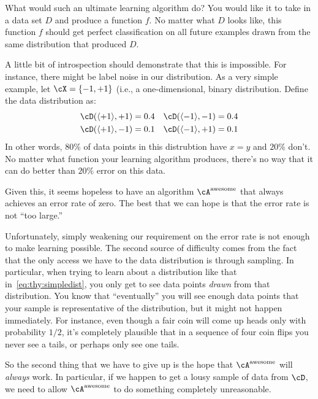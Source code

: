 What would such an ultimate learning algorithm do?  You would like it
to take in a data set $D$ and produce a function $f$.  No matter what
$D$ looks like, this function $f$ should get perfect classification on
all future examples drawn from the same distribution that produced
$D$.

A little bit of introspection should demonstrate that this is
impossible.  For instance, there might be label noise in our
distribution.  As a very simple example, let $\cX = \{-1,+1\}$ (i.e.,
a one-dimensional, binary distribution.  Define the data distribution
as:
\begin{align}  \label{eq:thy:simpledist}
\cD( \langle +1 \rangle , +1 ) &= 0.4 &
\cD( \langle -1 \rangle , -1 ) &= 0.4 \\
\cD( \langle +1 \rangle , -1 ) &= 0.1 &
\cD( \langle -1 \rangle , +1 ) &= 0.1
\end{align}
In other words, $80\%$ of data points in this distrubtion have $x = y$
and $20\%$ don't.  No matter what function your learning algorithm
produces, there's no way that it can do better than $20\%$ error on
this data.


Given this, it seems hopeless to have an algorithm
$\cA^{\text{awesome}}$ that always achieves an error rate of zero.
The best that we can hope is that the error rate is not ``too large.''

Unfortunately, simply weakening our requirement on the error rate is
not enough to make learning possible.  The second source of difficulty
comes from the fact that the only access we have to the data
distribution is through sampling.  In particular, when trying to learn
about a distribution like that in~\ref{eq:thy:simpledist}, you only get
to see data points \emph{drawn} from that distribution.  You know that
``eventually'' you will see enough data points that your sample is
representative of the distribution, but it might not happen
immediately.  For instance, even though a fair coin will come up heads
only with probability $1/2$, it's completely plausible that in a
sequence of four coin flips you never see a tails, or perhaps only see
one tails.

So the second thing that we have to give up is the hope that
$\cA^{\text{awesome}}$ will \emph{always} work.  In particular, if we
happen to get a lousy sample of data from $\cD$, we need to allow
$\cA^{\text{awesome}}$ to do something completely unreasonable.

